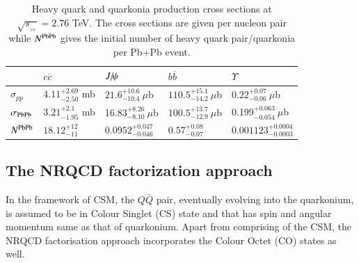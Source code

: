 \begin{table}
  \begin{center}
\caption[]{Heavy quark and quarkonia production  cross sections at
$\sqrt{s_{_{_{NN}}}}= 2.76$ TeV. The cross sections are given per nucleon pair while
$N^{\rm PbPb}$ gives the initial number of heavy quark pair/quarkonia per Pb+Pb event.}
\label{NLOcros}
\begin{tabular}{l|l|l|l|l} 
\hline 
\hline
             & $ c \overline c$            &$J\hspace{-.08em}/\hspace{-.14em}\psi$                      & $ b \overline b$                    & $\Upsilon$   \\              
\hline
$\sigma_{pp}$ & $4.11^{+2.69}_{-2.50}$ mb    & $21.6^{+10.6}_{-10.4}~\mu$b   & $110.5^{+15.1}_{-14.2}~\mu$b            & $0.22^{+0.07}_{-0.06}~\mu$b  \\


$\sigma_{\rm PbPb}$ & $3.21^{+2.1}_{-1.95}$ mb    &16.83$^{+8.26}_{-8.10}~\mu$b    & $100.5^{+13.7}_{-12.9}~\mu$b             & 0.199$^{+0.063}_{-0.054}~\mu$b  \\



$N^{\rm PbPb}$     & $18.12^{+12}_{-11}$       & $0.0952^{+0.047}_{-0.046}$         & $0.57^{+0.08}_{-0.07}$                          & $0.001123^{+0.0004}_{-0.0003}$       \\

\hline
\hline
\end{tabular}
\end{center}
\end{table}






\subsection{The NRQCD factorization approach}


In the framework of CSM, the $Q\bar{Q}$ pair, eventually evolving into the quarkonium,
is assumed to be in Colour Singlet (CS) state and that has spin and 
angular momentum same as that of quarkonium.
Apart from comprising of the CSM, the NRQCD factorisation approach incorporates 
the Colour Octet (CO) states as well.

